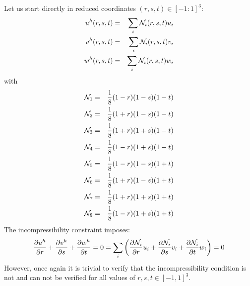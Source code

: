 Let us start directly in reduced coordinates $(r,s,t)\in [-1:1]^3$:
\begin{eqnarray}
u^h(r,s,t)&=&\sum_i {\mathcal{N}}_i(r,s,t) u_i\nonumber\\
v^h(r,s,t)&=&\sum_i {\mathcal{N}}_i(r,s,t) v_i\nonumber\\
w^h(r,s,t)&=&\sum_i {\mathcal{N}}_i(r,s,t) w_i\nonumber
\end{eqnarray}
with
\begin{eqnarray}
{\mathcal{N}}_1&=&\frac{1}{8} (1-r)(1-s)(1-t) \nonumber\\ 
{\mathcal{N}}_2&=&\frac{1}{8} (1+r)(1-s)(1-t) \nonumber\\ 
{\mathcal{N}}_3&=&\frac{1}{8} (1+r)(1+s)(1-t) \nonumber\\ 
{\mathcal{N}}_4&=&\frac{1}{8} (1-r)(1+s)(1-t) \nonumber\\ 
{\mathcal{N}}_5&=&\frac{1}{8} (1-r)(1-s)(1+t) \nonumber\\ 
{\mathcal{N}}_6&=&\frac{1}{8} (1+r)(1-s)(1+t) \nonumber\\ 
{\mathcal{N}}_7&=&\frac{1}{8} (1+r)(1+s)(1+t) \nonumber\\ 
{\mathcal{N}}_8&=&\frac{1}{8} (1-r)(1+s)(1+t) \nonumber
\end{eqnarray}
The incompressibility constraint imposes:
\[
\frac{\partial u^h}{\partial r}+
\frac{\partial v^h}{\partial s}+
\frac{\partial w^h}{\partial t}=0
=
\sum_i \left(  
\frac{\partial {\mathcal{N}}_i}{\partial r} u_i+
\frac{\partial {\mathcal{N}}_i}{\partial s} v_i+
\frac{\partial {\mathcal{N}}_i}{\partial t} w_i
\right)
=0
\]
However, once again it is trivial to verify that the incompressibility
condition is not and can not be verified for all values of
$r,s,t \in [-1,1]^3$.

